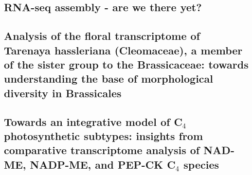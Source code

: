 \subsection{RNA-seq assembly - are we there yet?}


\subsection{Analysis of the floral transcriptome of Tarenaya hassleriana (Cleomaceae), a member of the sister group to the Brassicaceae: towards understanding the base of morphological diversity in Brassicales}


\subsection{Towards an integrative model of C$_4$ photosynthetic subtypes: insights from comparative transcriptome analysis of NAD-ME, NADP-ME, and PEP-CK C$_4$ species}

